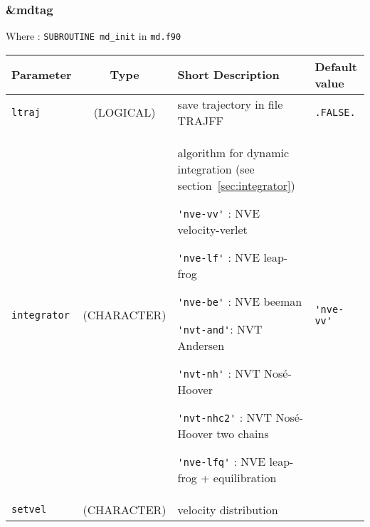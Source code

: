 \documentclass[a4paper]{article}
\begin{document}
\subsubsection{\&mdtag}

Where : \verb?SUBROUTINE md_init? in \verb?md.f90?
\newline

\begin{longtable}{l|c|m{8cm}|m{2cm}}
\hline
\hline
Parameter        &  Type              &          Short Description                                                          & Default value \\
\hline
\hline
\rule[-0.75cm]{0cm}{1.5cm}
\verb?ltraj?         & (LOGICAL)      &  save trajectory in file TRAJFF                                                     & \verb?.FALSE.? \\
\hline
\rule[-0.75cm]{0cm}{1.5cm}
\verb?integrator?    & (CHARACTER)    &  \newline algorithm for dynamic integration (see section~\ref{sec:integrator}) \newline                   

                                         \verb?'nve-vv'? : NVE velocity-verlet \newline
					  
					 \verb?'nve-lf'? : NVE leap-frog \newline
					   
				         \verb?'nve-be'? : NVE beeman \newline
					 
					 \verb?'nvt-and'?: NVT Andersen \newline
					 
					 \verb?'nvt-nh'? : NVT Nosé-Hoover \newline
					 
					 \verb?'nvt-nhc2'? : NVT Nosé-Hoover two chains \newline
					 
					 \verb?'nve-lfq'? : NVE leap-frog +  equilibration \newline                         & \verb?'nve-vv'? \tabularnewline
\hline
\rule[-0.75cm]{0cm}{1.5cm}
\verb?setvel?        & (CHARACTER)    &  \newline velocity distribution \newline 
                                        

\end{longtable}
\end{document}
